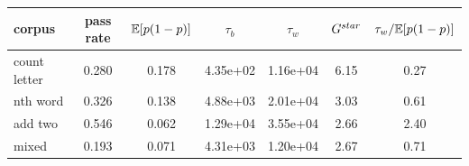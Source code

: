 \begin{tabular}{lcccccc}
\toprule
corpus & pass rate & $\mathbb{E}[p(1-p)]$ & $\tau_b$ & $\tau_w$ & $G^{\\star}$ & $\tau_w/\mathbb{E}[p(1-p)]$ \\
\midrule
count letter & 0.280 & 0.178 & 4.35e+02 & 1.16e+04 & 6.15 & 0.27 \\
nth word & 0.326 & 0.138 & 4.88e+03 & 2.01e+04 & 3.03 & 0.61 \\
add two & 0.546 & 0.062 & 1.29e+04 & 3.55e+04 & 2.66 & 2.40 \\
mixed & 0.193 & 0.071 & 4.31e+03 & 1.20e+04 & 2.67 & 0.71 \\
\bottomrule
\end{tabular}